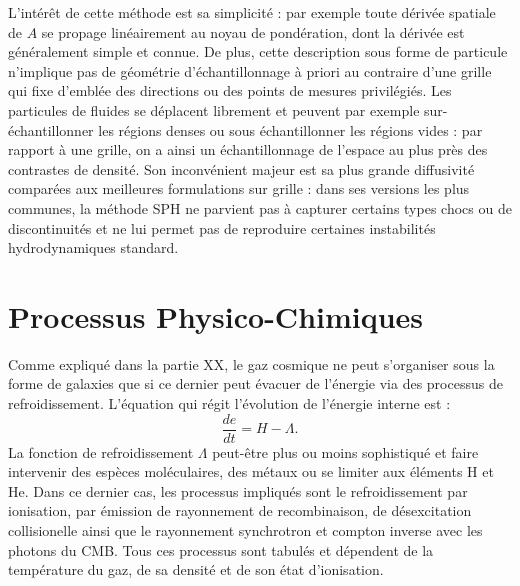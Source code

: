 L'intérêt de cette méthode est sa simplicité : par exemple toute dérivée spatiale de $A$ se propage linéairement au noyau de pondération, dont la dérivée est généralement simple et connue. De plus, cette description sous forme de particule n'implique pas de géométrie d'échantillonnage à priori au contraire d'une grille qui fixe d'emblée des directions ou des points de mesures privilégiés. Les particules de fluides se déplacent librement et peuvent par exemple sur-échantillonner les régions denses ou sous échantillonner les régions vides : par rapport à une grille, on a ainsi un échantillonnage de l'espace au plus près des contrastes de densité. Son inconvénient majeur est sa plus grande diffusivité comparées aux meilleures formulations sur grille : dans ses versions les plus communes, la méthode SPH ne parvient pas à capturer certains types chocs ou de discontinuités et ne lui permet pas de reproduire certaines instabilités hydrodynamiques standard. 

\section{Processus Physico-Chimiques}
Comme expliqué dans la partie XX, le gaz cosmique ne peut s'organiser sous la forme de galaxies que si ce dernier peut évacuer de l'énergie via des processus de refroidissement. L'équation qui régit l'évolution de l'énergie interne est :
\begin{equation}
\frac{de}{dt}=H-\Lambda.
\end{equation}
La fonction de refroidissement $\Lambda$ peut-être plus ou moins sophistiqué et faire intervenir des espèces moléculaires, des métaux  ou se limiter aux éléments H et He. Dans ce dernier cas, les processus impliqués sont le refroidissement par ionisation, par émission de rayonnement de recombinaison, de désexcitation collisionelle ainsi que le rayonnement synchrotron et compton inverse avec les photons du CMB. Tous ces processus sont tabulés et dépendent de la température du gaz, de sa densité et de son état d'ionisation. 


